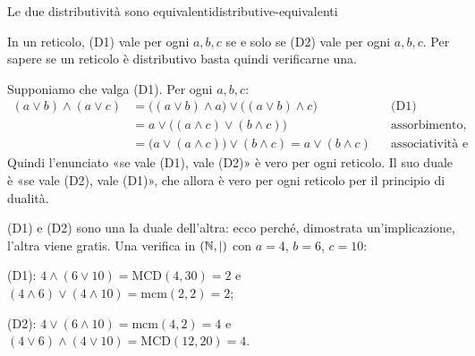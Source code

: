 \begin{concetto}
\begin{Proposizione}{Le due distributività sono equivalenti}{distributive-equivalenti}
    \begin{prerequisiti}
    \end{prerequisiti}
    In un reticolo, (D1) vale per ogni $a, b, c$ se e solo se (D2) vale per ogni $a, b, c$. Per sapere se un reticolo è distributivo basta quindi
    verificarne una.
\end{Proposizione}
\begin{dimostrazione}
    \facoltativa
    Supponiamo che valga (D1). Per ogni $a, b, c$:
    \begin{align*}
        (a \vee b) \wedge (a \vee c) &= \big((a \vee b) \wedge a\big) \vee \big((a \vee b) \wedge c\big) && \text{(D1)} \\
        &= a \vee \big((a \wedge c) \vee (b \wedge c)\big) && \text{assorbimento, commutatività e (D1)} \\
        &= \big(a \vee (a \wedge c)\big) \vee (b \wedge c) = a \vee (b \wedge c) && \text{associatività e assorbimento.}
    \end{align*}
    Quindi l'enunciato «se vale (D1), vale (D2)» è vero per ogni reticolo. Il suo duale è «se vale (D2), vale (D1)», che allora è vero per ogni
    reticolo per il principio di dualità.
\end{dimostrazione}
\end{concetto}

\begin{spiegazione}
    (D1) e (D2) sono una la duale dell'altra: ecco perché, dimostrata un'implicazione, l'altra viene gratis. Una verifica in $(\mathbb{N}, \mid)$
    con $a = 4$, $b = 6$, $c = 10$:
    \begin{passi}
        \item (D1): $4 \wedge (6 \vee 10) = \mathrm{MCD}(4, 30) = 2$ e $(4 \wedge 6) \vee (4 \wedge 10) = \mathrm{mcm}(2, 2) = 2$;
        \item (D2): $4 \vee (6 \wedge 10) = \mathrm{mcm}(4, 2) = 4$ e $(4 \vee 6) \wedge (4 \vee 10) = \mathrm{MCD}(12, 20) = 4$.
    \end{passi}
\end{spiegazione}

